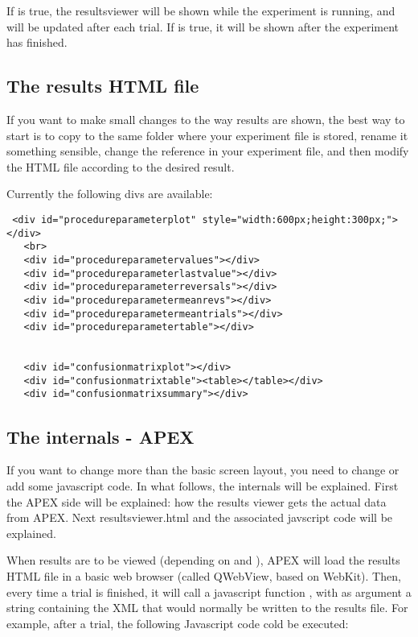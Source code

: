 If  is true, the resultsviewer will be shown while the experiment is running, and will be updated after each trial. If  is true, it will be shown after the experiment has finished.

\subsection{The results HTML file}

If you want to make small changes to the way results are shown, the best way to start is to copy  to the same folder where your experiment file is stored, rename it something sensible, change the reference in your experiment file, and then modify the HTML file according to the desired result. 

Currently the following divs are available:

\begin{lstlisting}
 <div id="procedureparameterplot" style="width:600px;height:300px;"></div>
   <br>
   <div id="procedureparametervalues"></div>
   <div id="procedureparameterlastvalue"></div>
   <div id="procedureparameterreversals"></div>
   <div id="procedureparametermeanrevs"></div>
   <div id="procedureparametermeantrials"></div>
   <div id="procedureparametertable"></div>


   <div id="confusionmatrixplot"></div>
   <div id="confusionmatrixtable"><table></table></div>
   <div id="confusionmatrixsummary"></div>
\end{lstlisting}

\subsection{The internals - APEX}

If you want to change more than the basic screen layout, you need to change or add some javascript code. In what follows, the internals will be explained. First the APEX side will be explained: how the results viewer gets the actual data from APEX. Next resultsviewer.html and the associated javscript code will be explained.

When results are to be viewed (depending on  and ), APEX will load the results HTML file in a basic web browser (called QWebView, based on WebKit). Then, every time a trial is finished, it will call a javascript function , with as argument a string containing the XML that would normally be written to the results file. For example, after a trial, the following Javascript code cold be executed:


